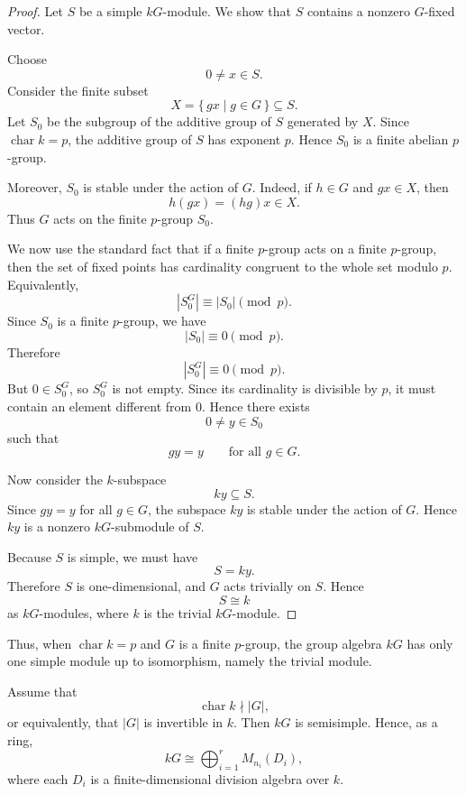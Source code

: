 \begin{proof}
    Let \(S\) be a simple \(kG\)-module. We show that \(S\) contains a nonzero
    \(G\)-fixed vector.

    Choose
    \[
        0\neq x\in S.
    \]
    Consider the finite subset
    \[
        X=\{\,gx\mid g\in G\,\}\subseteq S.
    \]
    Let \(S_0\) be the subgroup of the additive group of \(S\) generated by \(X\).
    Since \(\operatorname{char}k=p\), the additive group of \(S\) has exponent
    \(p\). Hence \(S_0\) is a finite abelian \(p\)-group.

    Moreover, \(S_0\) is stable under the action of \(G\). Indeed, if \(h\in G\)
    and \(gx\in X\), then
    \[
        h(gx)=(hg)x\in X.
    \]
    Thus \(G\) acts on the finite \(p\)-group \(S_0\).

    We now use the standard fact that if a finite \(p\)-group acts on a finite
    \(p\)-group, then the set of fixed points has cardinality congruent to the
    whole set modulo \(p\). Equivalently,
    \[
        |S_0^G|\equiv |S_0|\pmod p.
    \]
    Since \(S_0\) is a finite \(p\)-group, we have
    \[
        |S_0|\equiv 0\pmod p.
    \]
    Therefore
    \[
        |S_0^G|\equiv 0\pmod p.
    \]
    But \(0\in S_0^G\), so \(S_0^G\) is not empty. Since its cardinality is
    divisible by \(p\), it must contain an element different from \(0\). Hence
    there exists
    \[
        0\neq y\in S_0
    \]
    such that
    \[
        gy=y
        \qquad
        \text{for all }g\in G.
    \]

    Now consider the \(k\)-subspace
    \[
        ky\subseteq S.
    \]
    Since \(gy=y\) for all \(g\in G\), the subspace \(ky\) is stable under the
    action of \(G\). Hence \(ky\) is a nonzero \(kG\)-submodule of \(S\).

    Because \(S\) is simple, we must have
    \[
        S=ky.
    \]
    Therefore \(S\) is one-dimensional, and \(G\) acts trivially on \(S\). Hence
    \[
        S\cong k
    \]
    as \(kG\)-modules, where \(k\) is the trivial \(kG\)-module.
\end{proof}

\begin{remark}
    Thus, when \(\operatorname{char}k=p\) and \(G\) is a finite \(p\)-group, the
    group algebra \(kG\) has only one simple module up to isomorphism, namely the
    trivial module.
\end{remark}

\begin{theorem}
    Assume that
    \[
        \operatorname{char}k\nmid |G|,
    \]
    or equivalently, that \(|G|\) is invertible in \(k\). Then \(kG\) is
    semisimple. Hence, as a ring,
    \[
        kG
        \cong
        \bigoplus_{i=1}^r M_{n_i}(D_i),
    \]
    where each \(D_i\) is a finite-dimensional division algebra over \(k\).
\end{theorem}

